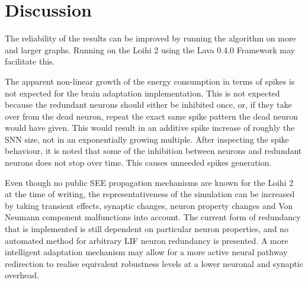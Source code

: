 \section{Discussion}\label{sec:discussion}
The reliability of the results can be improved by running the algorithm on more and larger graphs. Running on the Loihi 2 using the Lava 0.4.0 Framework may facilitate this. 

The apparent non-linear growth of the energy consumption in terms of spikes is not expected for the brain adaptation implementation. This is not expected because the redundant neurons should either be inhibited once, or, if they take over from the dead neuron, repeat the exact same spike pattern the dead neuron would have given. This would result in an additive spike increase of roughly the SNN size, not in an exponentially growing multiple. After inspecting the spike behaviour, it is noted that some of the inhibition between neurons and redundant neurons does not stop over time. This causes unneeded spikes generation.

Even though no public SEE propagation mechanisms are known for the Loihi 2 at the time of writing, the representativeness of the simulation can be increased by taking transient effects, synaptic changes, neuron property changes and Von Neumann component malfunctions into account. The current form of redundancy that is implemented is still dependent on particular neuron properties, and no automated method for arbitrary LIF neuron redundancy is presented. A more intelligent adaptation mechanism may allow for a more active neural pathway redirection to realise equivalent robustness levels at a lower neuronal and synaptic overhead. 

